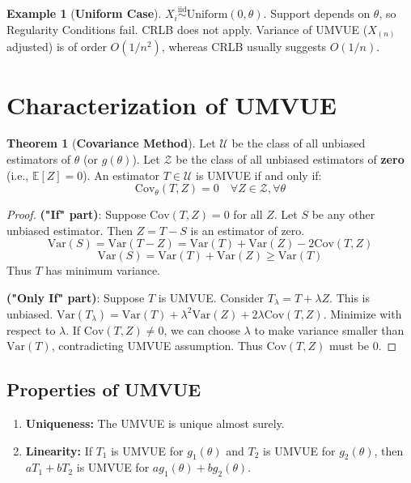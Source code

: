 \documentclass[12pt, a4paper]{article}
\theoremstyle{definition}
\newtheorem{example}{Example}
\newtheorem{theorem}{Theorem}
\newcommand{\E}{\mathbb{E}}
\newcommand{\Var}{\text{Var}}
\newcommand{\iid}{\overset{\text{iid}}{\sim}}
\begin{document}
\begin{example}[\textbf{Uniform Case}]
$X_i \iid \text{Uniform}(0, \theta)$.
Support depends on $\theta$, so Regularity Conditions fail.
CRLB does not apply.
Variance of UMVUE ($X_{(n)}$ adjusted) is of order $O(1/n^2)$, whereas CRLB usually suggests $O(1/n)$.
\end{example}

\section{Characterization of UMVUE}

\begin{theorem}[\textbf{Covariance Method}]
Let $\mathcal{U}$ be the class of all unbiased estimators of $\theta$ (or $g(\theta)$).
Let $\mathcal{Z}$ be the class of all unbiased estimators of \textbf{zero} (i.e., $\E[Z] = 0$).
An estimator $T \in \mathcal{U}$ is UMVUE if and only if:
$$ \text{Cov}_\theta(T, Z) = 0 \quad \forall Z \in \mathcal{Z}, \forall \theta $$
\end{theorem}

\begin{proof}
\textbf{("If" part)}: Suppose $\text{Cov}(T, Z) = 0$ for all $Z$.
Let $S$ be any other unbiased estimator. Then $Z = T - S$ is an estimator of zero.
$$ \Var(S) = \Var(T - Z) = \Var(T) + \Var(Z) - 2\text{Cov}(T, Z) $$
$$ \Var(S) = \Var(T) + \Var(Z) \ge \Var(T) $$
Thus $T$ has minimum variance.

\textbf{("Only If" part)}: Suppose $T$ is UMVUE.
Consider $T_\lambda = T + \lambda Z$. This is unbiased.
$\Var(T_\lambda) = \Var(T) + \lambda^2 \Var(Z) + 2\lambda \text{Cov}(T, Z)$.
Minimize with respect to $\lambda$. If $\text{Cov}(T, Z) \neq 0$, we can choose $\lambda$ to make variance smaller than $\Var(T)$, contradicting UMVUE assumption.
Thus $\text{Cov}(T, Z)$ must be 0.
\end{proof}

\subsection{Properties of UMVUE}
\begin{enumerate}
    \item \textbf{Uniqueness:} The UMVUE is unique almost surely.
    \item \textbf{Linearity:} If $T_1$ is UMVUE for $g_1(\theta)$ and $T_2$ is UMVUE for $g_2(\theta)$, then $a T_1 + b T_2$ is UMVUE for $a g_1(\theta) + b g_2(\theta)$.
\end{enumerate}
\end{document}
